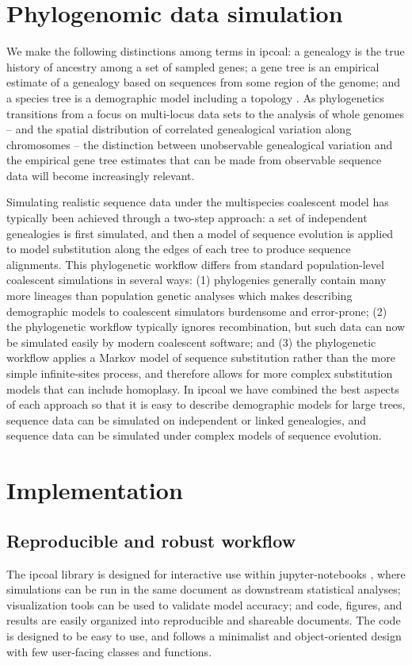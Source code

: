\documentclass[11pt]{article}
\begin{document}
\section{Phylogenomic data simulation}
We make the following distinctions among terms in ipcoal: a genealogy is the true history of ancestry among a set of sampled genes; a gene tree is an empirical estimate of a genealogy based on sequences from some region of the genome; and a species tree is a demographic model including a topology \cite{pamilo_relationships_1988,maddison_gene_1997}. As phylogenetics transitions from a focus on multi-locus data sets \cite{knowles_estimating_2011} to the analysis of whole genomes -- and the spatial distribution of correlated genealogical variation along chromosomes -- the distinction between unobservable genealogical variation and the empirical gene tree estimates that can be made from observable sequence data will become increasingly relevant. 

Simulating realistic sequence data under the multispecies coalescent model has typically been achieved through a two-step approach: a set of independent genealogies is first simulated, and then a model of sequence evolution is applied to model substitution along the edges of each tree to produce sequence alignments. This phylogenetic workflow differs from standard population-level coalescent simulations in several ways: (1) phylogenies generally contain many more lineages than population genetic analyses which makes describing demographic models to coalescent simulators burdensome and error-prone; (2) the phylogenetic workflow typically ignores recombination, but such data can now be simulated easily by modern coalescent software; and (3) the phylogenetic workflow applies a Markov model of sequence substitution rather than the more simple infinite-sites process, and therefore allows for more complex substitution models that can include homoplasy. In ipcoal we have combined the best aspects of each approach so that it is easy to describe demographic models for large trees, sequence data can be simulated on independent or linked genealogies, and sequence data can be simulated under complex models of sequence evolution. 

\section{Implementation}
\label{sec:headings}
\subsection{Reproducible and robust workflow}
The ipcoal library is designed for interactive use within jupyter-notebooks \cite{kluyver_jupyter_2016}, where simulations can be run in the same document as downstream statistical analyses; visualization tools can be used to validate model accuracy; and code, figures, and results are easily organized into reproducible and shareable documents. The code is designed to be easy to use, and follows a minimalist and object-oriented design with few user-facing classes and functions.
\end{document}
